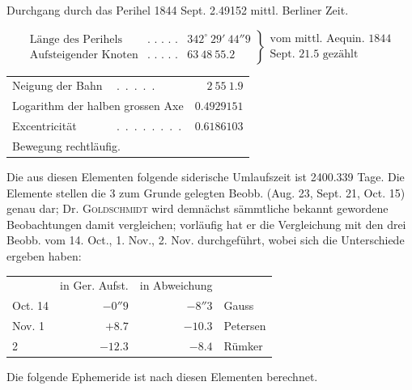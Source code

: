 \begin{center}
Durchgang durch das Perihel 1844 Sept. 2.49152 mittl. Berliner Zeit.
\end{center}
{\small
\[
\left.\begin{array}{llr}
\text{Länge des Perihels} & \text{.\ .\ .\ .\ .} & 342^\circ\ 29'\ 44''9 \\
\text{Aufsteigender Knoten} & \text{.\ .\ .\ .\ .} & 63\ 48\ 55.2
\end{array}\right\}
\begin{array}{l}
\text{vom mittl. Aequin. 1844} \\
\text{Sept. 21.5 gezählt}
\end{array}
\]
}
\begin{center}
\setlength{\tabcolsep}{4pt}
\begin{tabular}{llr}
Neigung der Bahn & \mbox{.\ .\ .\ .\ .} & $2\ 55\ 1.9$ \\
\multicolumn{2}{l}{Logarithm der halben grossen Axe} & $0.4929151$ \\
Excentricität & \mbox{.\ .\ .\ .\ .\ .\ .\ .} & $0.6186103$ \\
\multicolumn{3}{l}{Bewegung rechtläufig.}
\end{tabular}
\end{center}

Die aus diesen Elementen folgende siderische Umlaufszeit ist 2400.339 Tage. Die Elemente stellen die 3 zum Grunde gelegten Beobb. (Aug. 23, Sept. 21, Oct. 15) genau dar; Dr. \textsc{Goldschmidt} wird demnächst sämmtliche bekannt gewordene Beobachtungen damit vergleichen; vorläufig hat er die Vergleichung mit den drei Beobb. vom 14. Oct., 1. Nov., 2. Nov. durchgeführt, wobei sich die Unterschiede ergeben haben:

\begin{center}
\begin{tabular}{lrrl}
 & in Ger. Aufst. & in Abweichung & \\
Oct. 14 & $-0''9$ & $-8''3$ & Gauss \\
Nov. 1 & $+8.7$ & $-10.3$ & Petersen \\
\hfill 2 & $-12.3$ & $-8.4$ & Rümker \\
\end{tabular}
\end{center}

Die folgende Ephemeride ist nach diesen Elementen berechnet.

\par{}\bigskip
\hypertarget{native-475-lower}{}

